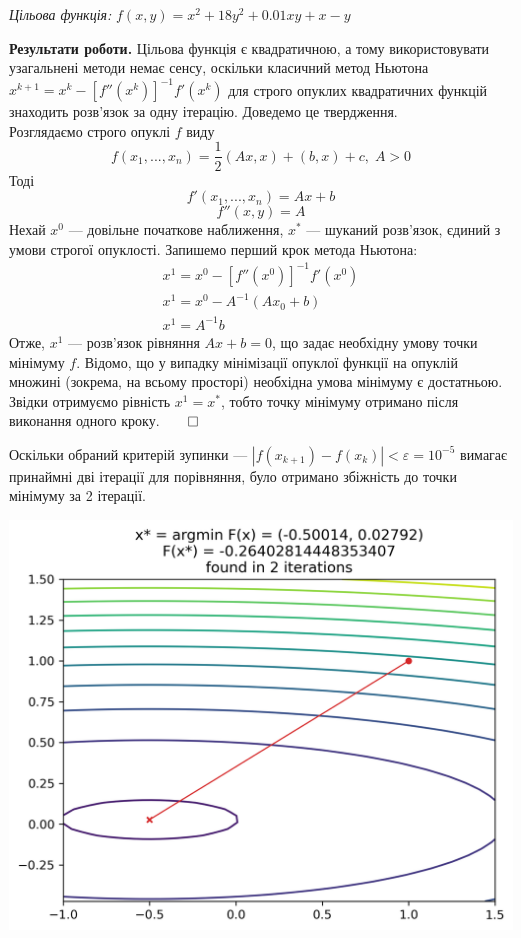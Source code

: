 \documentclass{extreport}
\begin{document}
\emph{Цільова функція:}
$f(x,y) = x^2 + 18y^2 + 0.01xy + x - y$

\noindent\textbf{Результати роботи.}
Цільова функція є квадратичною, а тому використовувати узагальнені методи немає сенсу,
оскільки класичний метод Ньютона $x^{k+1} = x^k - [f''(x^k)]^{-1} f'(x^k)$
для строго опуклих квадратичних функцій знаходить розв'язок за одну ітерацію.
Доведемо це твердження. \\
Розглядаємо строго опуклі $f$ виду
$$f(x_1, ..., x_n) = \frac{1}{2}\left( A x, x\right) + \left(b, x\right) + c, \; A > 0$$
Тоді $$f'(x_1, ..., x_n) = Ax + b$$
$$ f''(x,y) = A$$
Нехай $x^0$ --- довільне початкове наближення, $x^*$ --- шуканий розв'язок, єдиний з умови строгої опуклості.
Запишемо перший крок метода Ньютона:
\begin{gather*}
    x^1 = x^0 - [f''(x^0)]^{-1} f'(x^0) \\
    x^1 = x^0 - A^{-1} \left( Ax_0 + b\right) \\
    x^1 = A^{-1}b
\end{gather*}
Отже, $x^1$ --- розв'язок рівняння $Ax+b=0$, що задає необхідну умову точки
мінімуму $f$. Відомо, що у випадку мінімізації опуклої функції на опуклій множині
(зокрема, на всьому просторі) необхідна умова мінімуму є достатньою.
Звідки отримуємо рівність $ x^1 =  x^*$, тобто точку мінімуму отримано після виконання одного кроку.$\qed$ 

Оскільки обраний критерій зупинки --- $\left| f(x_{k+1}) - f(x_k)\right| < \varepsilon = 10^{-5}$
вимагає принаймні дві ітерації для порівняння, було отримано збіжність до точки мінімуму за 2 ітерації.
\begin{center}
    \includegraphics[scale = 0.8]{contour_final.png}
\end{center}
\end{document}
